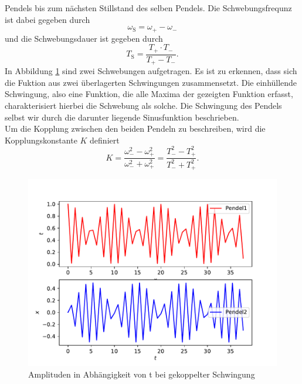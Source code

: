 \begin{enumerate}
        Pendels bis zum nächsten Stillstand des selben Pendels. Die Schwebungsfrequnz ist dabei gegeben durch
        \begin{equation}
            \omega_\text{S}=\omega_+ - \omega_-
        \end{equation}
        und die Schwebungsdauer ist gegeben durch
        \begin{equation}
            T_\text{S}=\frac{T_+\cdot T_-}{T_+-T_-}.
        \end{equation}
        In Abbildung \ref{fig:gekoppelt} sind zwei Schwebungen aufgetragen. Es ist zu erkennen, dass sich die Fuktion aus zwei überlagerten Schwingungen zusammensetzt.
        Die einhüllende Schwingung, also eine Funktion, die alle Maxima der gezeigten Funktion erfasst, charakterisiert hierbei die Schwebung als solche. Die Schwingung
        des Pendels selbst wir durch die darunter liegende Sinusfunktion beschrieben.
        \\
        Um die Kopplung zwischen den beiden Pendeln zu beschreiben, wird die Kopplungskonstante $K$ definiert
        \begin{equation}
            K=\frac{\omega_-^2-\omega_+^2}{\omega_-^2+\omega_+^2}=\frac{T_-^2-T_+^2}{T_-^2+T_+^2}.
        \end{equation}
        \begin{figure}
            \centering
            \includegraphics[scale = 0.7]{gekoppelt.pdf}
            \caption{Amplituden in Abhängigkeit von t bei gekoppelter Schwingung}
            \label{fig:gekoppelt}
        \end{figure}
\end{enumerate}
